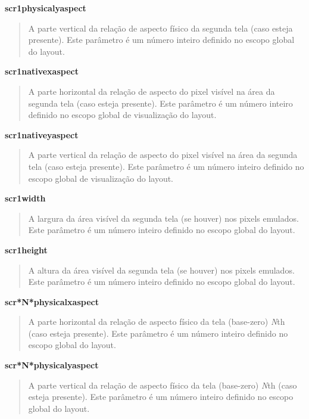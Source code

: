 \documentclass[letterpaper,10pt,brazil]{sphinxmanual}
\begin{document}
\textbf{scr1physicalyaspect}
\begin{quote}

A parte vertical da relação de aspecto físico da segunda tela
(caso esteja presente). Este parâmetro é um número inteiro
definido no escopo global do layout.
\end{quote}

\textbf{scr1nativexaspect}
\begin{quote}

A parte horizontal da relação de aspecto do pixel visível na área da
segunda tela (caso esteja presente). Este parâmetro é um número
inteiro definido no escopo global de visualização do layout.
\end{quote}

\textbf{scr1nativeyaspect}
\begin{quote}

A parte vertical da relação de aspecto do pixel visível na área da
segunda tela (caso esteja presente). Este parâmetro é um número inteiro
definido no escopo global de visualização do layout.
\end{quote}

\textbf{scr1width}
\begin{quote}

A largura da área visível da segunda tela (se houver) nos pixels
emulados. Este parâmetro é um número inteiro definido no escopo
global do layout.
\end{quote}

\textbf{scr1height}
\begin{quote}

A altura da área visível da segunda tela (se houver) nos pixels
emulados. Este parâmetro é um número inteiro definido no escopo
global do layout.
\end{quote}

\textbf{scr*N*physicalxaspect}
\begin{quote}

A parte horizontal da relação de aspecto físico da tela (base-zero)
\emph{N}th (caso esteja presente). Este parâmetro é um número inteiro
definido no escopo global do layout.
\end{quote}

\textbf{scr*N*physicalyaspect}
\begin{quote}

A parte vertical da relação de aspecto físico da tela (base-zero)
\emph{N}th (caso esteja presente). Este parâmetro é um número inteiro
definido no escopo global do layout.
\end{quote}
\end{document}
